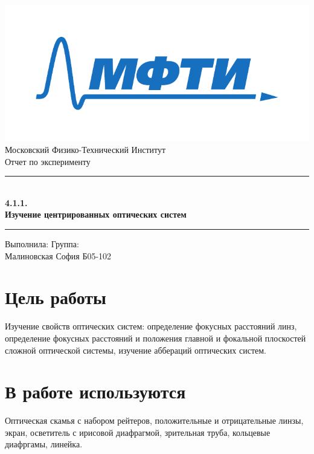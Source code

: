 \documentclass[a4paper,12pt]{article}
\begin{document}
\begin{titlepage}
		\vspace*{\fill}
		
		\begin{center}
			\includegraphics[scale=0.8]{MIPT.pdf}
			\\[0.7cm]\Huge Московский Физико-Технический Институт
			\\[2cm]\LARGE Отчет по эксперименту
			\\[0.5cm]\noindent\rule{\textwidth}{1pt}
			\\\Huge\textbf{4.1.1. \\ Изучение центрированных оптических систем}
			\\[-0.5cm]\noindent\rule{\textwidth}{1pt}
		\end{center}
		
		\vspace*{\fill}
		
		\begin{flushleft}
			Выполнила: \hspace{\fill} Группа:
			\\Малиновская София \hspace{\fill} Б05-102
		\end{flushleft}
	\end{titlepage}

	\setcounter{page}{2}


\section*{Цель работы}
Изучение свойств оптических систем: определение фокусных расстояний линз, определение фокусных расстояний и положения главной и фокальной плоскостей сложной оптической системы, изучение аббераций оптических систем.


\section*{В работе используются} 
Оптическая скамья с набором рейтеров, положительные и отрицательные линзы, экран, осветитель с ирисовой диафрагмой, зрительная труба, кольцевые диафргамы, линейка.
\end{document}

